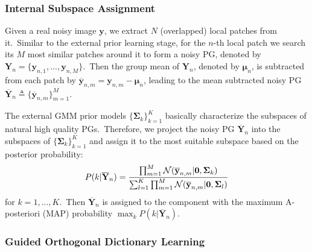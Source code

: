 \documentclass[10pt,twocolumn,letterpaper]{article}
\begin{document}
\subsubsection{Internal Subspace Assignment}

Given a real noisy image $\mathbf{y}$, we extract $N$ (overlapped) local patches from it.\ Similar to the external prior learning stage, for the $n$-th local patch we search its $M$ most similar patches around it to form a noisy PG, denoted by $\mathbf{Y}_{n} = \{\mathbf{y}_{n,1},...,\mathbf{y}_{n,M}\}$.\ Then the group mean of $\mathbf{Y}_{n}$, denoted by $\bm{\mu}_{n}$, is subtracted from each patch by $\mathbf{\overline{y}}_{n,m}=\mathbf{y}_{n,m}-\bm{\mu}_{n}$, leading to the mean subtracted noisy PG $\mathbf{\overline{Y}}_{n}\triangleq \{\mathbf{\overline{y}}_{n,m}\}_{m=1}^{M}$.

The external GMM prior models $\{\mathbf{\Sigma}_{k}\}_{k=1}^{K}$ basically characterize the subspaces of natural high quality PGs.\ Therefore, we project the noisy PG $\mathbf{\overline{Y}}_{n}$ into the subspaces of $\{\mathbf{\Sigma}_{k}\}_{k=1}^{K}$ and assign it to the most suitable subspace based on the posterior probability:
\vspace{-2mm}
\begin{equation}\label{equ3}\vspace{-2mm}
P(k|\mathbf{\overline{Y}}_{n})=\frac{\prod_{m=1}^{M}\mathcal{N}(\mathbf{\overline{y}}_{n,m}|\mathbf{0},\mathbf{\Sigma}_{k})}{\sum_{l=1}^{K}\prod_{m=1}^{M}\mathcal{N}(\mathbf{\overline{y}}_{n,m}|\mathbf{0},\mathbf{\Sigma}_{l})}
\end{equation}
for $k=1,...,K$.\ Then $\mathbf{\overline{Y}}_{n}$ is assigned to the component with the maximum A-posteriori (MAP) probability $\max_{k}P(k|\mathbf{\overline{Y}}_{n})$.


\subsubsection{Guided Orthogonal Dictionary Learning}
\end{document}
